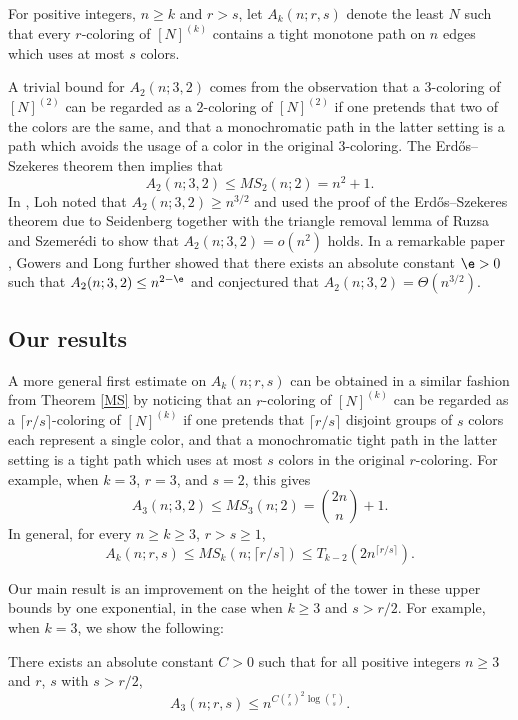 \begin{definition}
    For positive integers, $n \geq k$ and $r > s$, let $A_k(n; r, s)$ denote the least $N$ such that every $r$-coloring of $[N]^{(k)}$ contains a tight monotone path on $n$ edges which uses at most $s$ colors.
\end{definition}

A trivial bound for $A_{2}(n;3,2)$ comes from the observation that a $3$-coloring of $[N]^{(2)}$ can be regarded as a $2$-coloring of $[N]^{(2)}$ if one pretends that two of the colors are the same, and that a monochromatic path in the latter setting is a path which avoids the usage of a color in the original $3$-coloring. The Erd\H{o}s--Szekeres theorem then implies that
$$A_2(n; 3, 2) \leq MS_{2}(n;2) = n^2+1.$$
In \cite{Loh15}, Loh noted that $A_{2}(n;3,2) \geq n^{3/2}$ and used the proof of the Erd\H{o}s--Szekeres theorem due to Seidenberg \cite{Seid59} together with the triangle removal lemma of Ruzsa and Szemer\'edi \cite{RS78} to show that $A_{2}(n;3,2)=o(n^2)$ holds. In a remarkable paper \cite{GL21}, Gowers and Long further showed that there exists an absolute constant $\e > 0$ such that $A_2(n; 3, 2) \leq n^{2-\e}$ and conjectured that $A_{2}(n;3,2) = \Theta(n^{3/2})$. 


\subsection{Our results}

A more general first estimate on $A_{k}(n;r,s)$ can be obtained in a similar fashion from Theorem \ref{MS} by noticing that an $r$-coloring of $[N]^{(k)}$ can be regarded as a $\lceil r/s \rceil$-coloring of $[N]^{(k)}$ if one pretends that $\lceil r/s \rceil$ disjoint groups of $s$ colors each represent a single color, and that a monochromatic tight path in the latter setting is a tight path which uses at most $s$ colors in the original $r$-coloring. For example, when $k=3$, $r=3$, and $s=2$, this gives
$$A_3(n; 3, 2) \leq MS_3(n; 2) = \binom{2n}{n} + 1.$$
In general, for every $n \geq k \geq 3$, $r > s \geq 1$,
$$A_k(n; r, s) \leq MS_k(n; \lceil r/s \rceil) \leq T_{k-2}(2n^{\lceil r/s \rceil}).$$

Our main result is an improvement on the height of the tower in these upper bounds by one exponential, in the case when $k \geq 3$ and $s > r/2$. For example, when $k=3$, we show the following:

\begin{theorem}\label{main3}
    There exists an absolute constant $C > 0$ such that for all positive integers $n \geq 3$ and $r$, $s$ with $s > r/2$, 
    \begin{equation*}
        A_3(n; r, s) \leq n^{C \binom{r}{s}^2 \log \binom{r}{s}}.
    \end{equation*}
\end{theorem}

